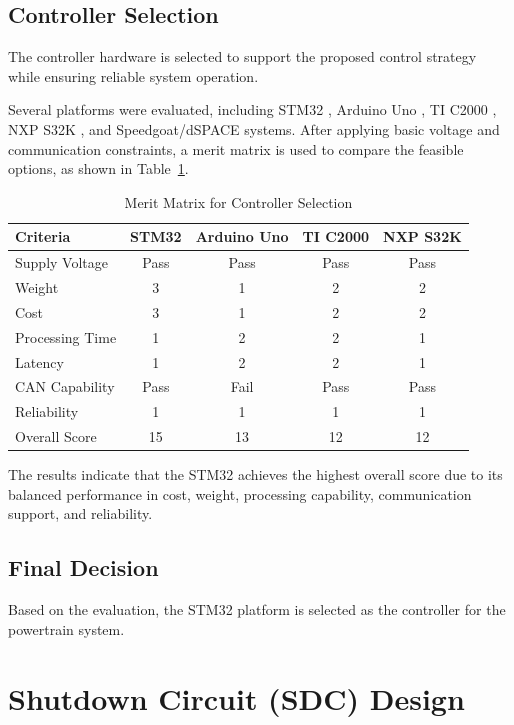 \documentclass[11pt, a4paper]{report}
\numberwithin{equation}{section}
\begin{document}
\subsection{Controller Selection}

The controller hardware is selected to support the proposed control strategy while ensuring reliable system operation.

Several platforms were evaluated, including STM32\cite{stm32-nucleo-f4}
, Arduino Uno\cite{Arduino_uno_data_sheet}
, TI C2000\cite{TI_C200_data_sheet}
, NXP S32K\cite{NPX_S32K_data_sheet}
, and Speedgoat/dSPACE systems\cite{Speedgoat_data_sheet}.
After applying basic voltage and communication constraints, a merit matrix is used to compare the feasible options, as shown in Table~\ref{tab:controller_selection}.

\begin{table}[H]
\centering
\caption{Merit Matrix for Controller Selection}
\label{tab:controller_selection}
\begin{tabular}{lcccc}
\toprule
Criteria & STM32 & Arduino Uno & TI C2000 & NXP S32K \\
\midrule
Supply Voltage & Pass & Pass & Pass & Pass \\
Weight & 3 & 1 & 2 & 2 \\
Cost & 3 & 1 & 2 & 2 \\
Processing Time & 1 & 2 & 2 & 1 \\
Latency & 1 & 2 & 2 & 1 \\
CAN Capability & Pass & Fail & Pass & Pass \\
Reliability & 1 & 1 & 1 & 1 \\
\midrule
Overall Score & 15 & 13 & 12 & 12 \\
\bottomrule
\end{tabular}
\end{table}

The results indicate that the STM32 achieves the highest overall score due to its balanced performance in cost, weight, processing capability, communication support, and reliability.

\subsection{Final Decision}

Based on the evaluation, the STM32 platform is selected as the controller for the powertrain system.

\section{Shutdown Circuit (SDC) Design}
\end{document}

